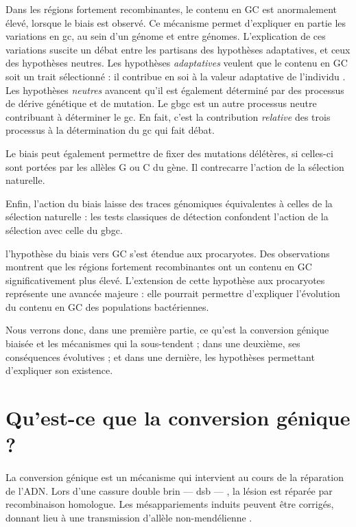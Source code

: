 \documentclass[11pt, oneside]{scrartcl}
\begin{document}
Dans les régions fortement recombinantes, le contenu en GC est anormalement
élevé, lorsque le biais est observé\cite{duret_impact_2008}. Ce mécanisme permet
d'expliquer en partie les variations en \ac{gc}, au sein d'un génome et entre
génomes. L'explication de ces variations suscite un débat entre les partisans
des hypothèses adaptatives, et ceux des hypothèses neutres. Les hypothèses
\emph{adaptatives} veulent que le contenu en GC soit un trait sélectionné : il
contribue en soi à la valeur adaptative de l'individu
\cite{hildebrand_evidence_2010}. Les hypothèses \emph{neutres} avancent qu'il est
également déterminé par des processus de dérive génétique et de mutation. Le
\ac{gbgc} est un autre processus neutre contribuant à déterminer le \ac{gc}. En
fait, c'est la contribution \emph{relative} des trois processus à la détermination du
\ac{gc} qui fait débat.

Le biais peut également permettre de fixer des mutations délétères, si celles-ci
sont portées par les allèles G ou C du gène. Il contrecarre l'action de la
sélection naturelle\cite{galtier_gc-biased_2009, galtier_adaptation_2007}.

Enfin, l'action du biais laisse des traces génomiques équivalentes à celles de
la sélection naturelle : les tests classiques de détection confondent l'action
de la sélection avec celle du \ac{gbgc}\cite{ratnakumar_detecting_2010}.

 l'hypothèse du biais vers GC s'est étendue aux
procaryotes\cite{lassalle_gc-content_2015}. Des observations montrent que les
régions fortement recombinantes ont un contenu en GC significativement plus
élevé. L'extension de cette hypothèse aux procaryotes représente une avancée
majeure : elle pourrait permettre d'expliquer l'évolution du contenu en GC des
populations bactériennes.

Nous verrons donc, dans une première partie, ce qu'est la conversion génique
biaisée et les mécanismes qui la sous-tendent ; dans une deuxième, ses
conséquences évolutives ; et dans une dernière, les hypothèses permettant
d'expliquer son existence.

\section{Qu'est-ce que la conversion génique ?}
\label{sec:orgheadline8}

La conversion génique est un mécanisme qui intervient au cours de la réparation
de l'ADN. Lors d'une cassure double brin --- \ac{dsb} --- , la lésion est réparée par
recombinaison homologue. Les mésappariements induits peuvent être corrigés,
donnant lieu à une transmission d'allèle non-mendélienne \cite{chen_mechanism_2008}. 
\end{document}

